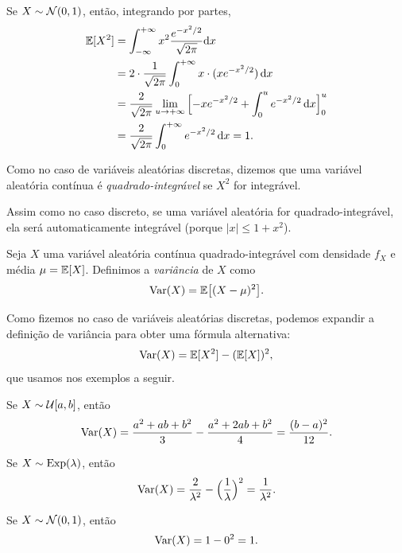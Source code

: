 \begin{example}
[Normal]
Se $X\sim \mathcal{N} (0,1)$,
então, integrando por partes,
\begin{align}
\mathbb{E} [X^2]
& =
\int_{-\infty}^{+\infty} x^2 \frac{e^{-x^2/2}}{\sqrt{2\pi}}\mathrm{d} x
\\
&
=
2 \cdot \frac{1}{\sqrt{2\pi}}
\int_{0}^{+\infty} x \cdot (x {e^{-x^2/2}}) \, \mathrm{d} x
\\
&
=
\frac{2}{\sqrt{2\pi}}
\lim_{u\to+\infty}
\Big[
{-x} {e^{-x^2/2}}
+
\int_{0}^{u}
e^{-x^2/2} \, \mathrm{d} x
\Big]_0^u
\\
&
=
\frac{2}{\sqrt{2\pi}}
\int_{0}^{+\infty} {e^{-x^2/2}} \, \mathrm{d} x
=
1
.
\end{align}
\end{example}

\begin{definition}
Como no caso de variáveis aleatórias discretas, dizemos que uma variável aleatória contínua é \emph{quadrado-integrável} se $ X^2 $ for integrável.
\end{definition}

Assim como no caso discreto, se uma variável aleatória for quadrado-integrável, ela será automaticamente integrável (porque $ |x| \leq 1+x^2 $).

\begin{definition}
[Variância]
Seja $ X $ uma variável aleatória contínua quadrado-integrável com densidade $ f_X $ e média $ \mu = \mathbb{E}[X] $.
Definimos a \emph{variância} de $ X $ como
\[
\mathrm{Var} (X) = \mathbb{E}\big[ (X - \mu)^2 \big]
.
\]
\end{definition}

Como fizemos no caso de variáveis aleatórias discretas, podemos expandir a definição de variância para obter uma fórmula alternativa:
\[
\mathrm{Var}(X) = \mathbb{E}[X^2] - (\mathbb{E}[X])^2
,
\]
que usamos nos exemplos a seguir.

\begin{example}
[Uniforme]
Se $X\sim \mathcal{U} [a,b]$, então
\[
\mathrm{Var}(X) =
\frac{a^2+ab+b^2}{3}
-
\frac{a^2+2ab+b^2}{4}
= \frac{(b-a)^2}{12} .
\]
\end{example}

\begin{example}
[Exponencial]
Se $X\sim\mathrm{Exp}(\lambda)$,
então
\[ \mathrm{Var}(X) = \frac{2}{\lambda^2} - \Big(\frac{1}{\lambda}\Big)^2 = \frac{1}{\lambda^2} .\]
\end{example}

\begin{example}
[Normal]
Se $X\sim\mathcal{N}(0,1)$,
então
\[
 \mathrm{Var}(X) = 1 - 0^2 = 1 .
\]
\end{example}


